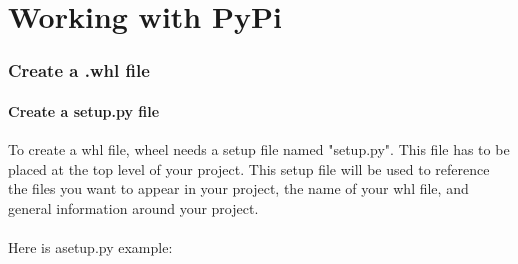 \documentclass[10pt,letterpaper]{article}
\begin{document}
\part {Working with PyPi}
\setcounter{section}{0}
\section {Create a .whl file}
\subsection {Create a setup.py file}
To create a whl file, wheel needs a setup file named "setup.py". This file has to be placed at the top level of your project. This setup file will be used to reference the files you want to appear in your project, the name of your whl file, and general information around your project.\\
\\Here is asetup.py example:
\end{document}
